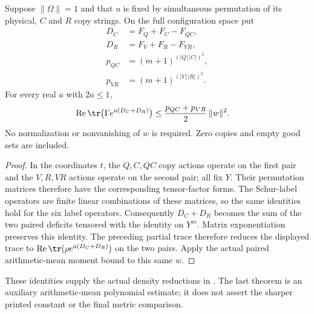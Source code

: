 \begin{theorem}
\label{thm:replica_good_configuration_sum_merge_moment}
\leanok
{}
Suppose $\|\Omega\|=1$ and that $u$ is fixed by simultaneous permutation
of its physical, $C$ and $R$ copy strings. On the full configuration space put
\begin{align}
 D_C&=F_Q+F_C-F_{QC},\\
 D_R&=F_V+F_R-F_{VR},\\
 p_{QC}&=(m+1)^{(|Q|\,|C|)^2},\\
 p_{VR}&=(m+1)^{(|V|\,|R|)^2}.
\end{align}
For every real $a$ with $2a\leq1$,
\begin{align}
 \operatorname{Re}\tr\bigl(\Gamma e^{a(D_C+D_R)}\bigr)
 &\leq \frac{p_{QC}+p_{VR}}2\,\|w\|^2.
\end{align}
No normalization or nonvanishing of $w$ is required. Zero copies and
empty good sets are included.
\end{theorem}
\begin{proof}\leanok
In the coordinates $t$, the $Q,C,QC$ copy actions operate on the first
pair and the $V,R,VR$ actions operate on the second pair; all fix $Y$.
Their permutation matrices therefore have the corresponding tensor-factor
forms. The Schur-label operators are finite linear combinations of these
matrices, so the same identities hold for the six label operators.
Consequently $D_C+D_R$ becomes the sum of the two paired deficits tensored
with the identity on $Y^m$. Matrix exponentiation preserves this identity.
The preceding partial trace therefore reduces the displayed trace to
$\operatorname{Re}\tr(\rho e^{a(D_C+D_R)})$ on the two pairs.
Apply the actual paired arithmetic-mean moment bound to this same $w$.
\end{proof}

These identities supply the actual density reductions in
\cite[Section~7, lines 501--555]{OpenAI2026AreaLaw}.
The last theorem is an auxiliary arithmetic-mean polynomial estimate;
it does not assert the sharper printed constant or the final metric comparison.
